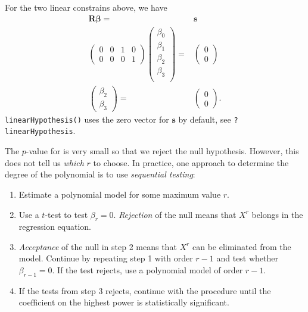 \documentclass[
]{article}
\providecommand{\tightlist}{%
  \setlength{\itemsep}{0pt}\setlength{\parskip}{0pt}}
\begin{document}
For the two linear constrains above, we have \begin{align*}
  \mathbf{R}\boldsymbol{\beta} =& \mathbf{s} \\
  \begin{pmatrix}
    0 & 0 & 1 & 0 \\
    0 & 0 & 0 & 1
  \end{pmatrix}
  \begin{pmatrix}
    \beta_0 \\
    \beta_1 \\
    \beta_2 \\
    \beta_3 \\
  \end{pmatrix} =&
  \begin{pmatrix}
   0 \\
   0
  \end{pmatrix} \\
  \begin{pmatrix}
    \beta_2 \\
    \beta_3
  \end{pmatrix}= &
  \begin{pmatrix}
    0 \\
    0
  \end{pmatrix}.
\end{align*} \texttt{linearHypothesis()} uses the zero vector for
\(\mathbf{s}\) by default, see \texttt{?linearHypothesis}.

The \(p\)-value for is very small so that we reject the null hypothesis.
However, this does not tell us \emph{which} \(r\) to choose. In
practice, one approach to determine the degree of the polynomial is to
use \emph{sequential testing}:

\begin{enumerate}
\def\labelenumi{\arabic{enumi}.}
\tightlist
\item
  Estimate a polynomial model for some maximum value \(r\).
\item
  Use a \(t\)-test to test \(\beta_r = 0\). \emph{Rejection} of the null
  means that \(X^r\) belongs in the regression equation.
\item
  \emph{Acceptance} of the null in step 2 means that \(X^r\) can be
  eliminated from the model. Continue by repeating step 1 with order
  \(r-1\) and test whether \(\beta_{r-1}=0\). If the test rejects, use a
  polynomial model of order \(r-1\).
\item
  If the tests from step 3 rejects, continue with the procedure until
  the coefficient on the highest power is statistically significant.
\end{enumerate}
\end{document}
